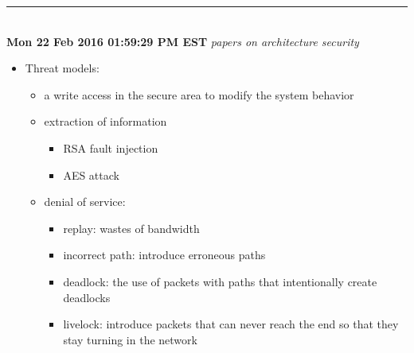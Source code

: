 \documentclass[]{article}
\begin{document}
\rule[-0.1cm]{7.5in}{0.01cm}\\
\noindent \textbf{Mon 22 Feb 2016 01:59:29 PM EST}
\textit{papers on architecture security}
\begin{itemize}
    \item \cite{diguet2007noc} Threat models:
        \begin{itemize}
            \item a write access in the secure area to modify the system behavior
            \item extraction of information
                \begin{itemize}
                    \item RSA fault injection\cite{pellegrini2010fault} 
                    \item AES attack\cite{moradi2006generalized}
                \end{itemize}
            \item denial of service:
                \begin{itemize}
                    \item replay: wastes of bandwidth
                    \item incorrect path: introduce erroneous paths
                    \item deadlock: the use of packets with paths that intentionally create deadlocks
                    \item livelock: introduce packets that can never reach the end so that they stay turning in the network
                \end{itemize}
        \end{itemize}
\end{itemize}

{}

\end{document}

